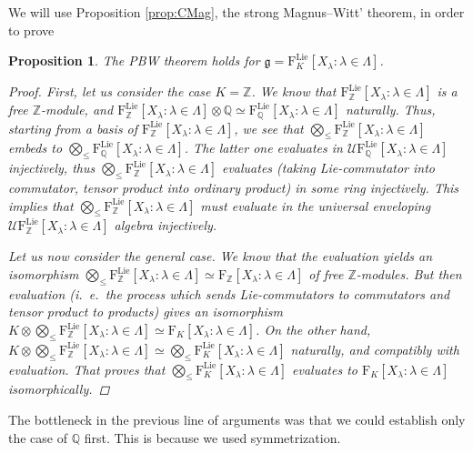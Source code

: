\documentclass[11pt,a4paper]{amsart}
\DeclareMathOperator{\Lie}{Lie}
\theoremstyle{definition}
\theoremstyle{plain}
\newtheorem{prop}[point]{Proposition}
\begin{document}
We will use Proposition \ref{prop:CMag}, the strong Magnus--Witt' theorem, in order to prove
\begin{prop} The PBW theorem holds for  $\mathfrak g=\mathrm F_{K}^{\Lie}[X_\lambda:\lambda\in\Lambda]$.
\begin{proof}First, let us consider the case $K=\mathbb Z$.
We know that
$\mathrm F_{\mathbb Z}^{\Lie}[X_\lambda:\lambda\in\Lambda]$ is a free $\mathbb Z$-module,
 and  $ \mathrm F_{\mathbb Z}^{\Lie}[X_\lambda:\lambda\in\Lambda]\otimes\mathbb Q
 \simeq\mathrm F_{\mathbb Q}^{\Lie}[X_\lambda:\lambda\in\Lambda]$
 naturally.
Thus, starting from a basis of $\mathrm F_{\mathbb Z}^{\Lie}[X_\lambda:\lambda\in\Lambda]$, we see that
 $\bigotimes_\leq \mathrm F_{\mathbb Z}^{\Lie}[X_\lambda:\lambda\in\Lambda]$ embeds to
 $\bigotimes_\leq \mathrm F_{\mathbb Q}^{\Lie}[X_\lambda:\lambda\in\Lambda]$.
The latter one evaluates in $\mathcal U \mathrm F_{\mathbb Q}^{\Lie}[X_\lambda:\lambda\in\Lambda]$ injectively, thus
 $\bigotimes_\leq \mathrm F_{\mathbb Z}^{\Lie}[X_\lambda:\lambda\in\Lambda]$ evaluates
 (taking Lie-commutator into commutator, tensor product into ordinary product) in some ring injectively.
This implies that $\bigotimes_\leq \mathrm F_{\mathbb Z}^{\Lie}[X_\lambda:\lambda\in\Lambda]$
 must evaluate in the universal enveloping  $\mathcal U \mathrm F_{\mathbb Z}^{\Lie}[X_\lambda:\lambda\in\Lambda]$ algebra injectively.

Let us now consider the general case.
We know that the evaluation yields an isomorphism
 $\bigotimes_\leq \mathrm F_{\mathbb Z}^{\Lie}[X_\lambda:\lambda\in\Lambda]\simeq \mathrm F_{\mathbb Z}[X_\lambda:\lambda\in\Lambda]$
 of free $\mathbb Z$-modules.
But then evaluation (i.~e.~the process which sends Lie-commutators to commutators and tensor product to products)
 gives an isomorphism $K\otimes\bigotimes_\leq
 \mathrm F_{\mathbb Z}^{\Lie}[X_\lambda:\lambda\in\Lambda]\simeq \mathrm F_{K}[X_\lambda:\lambda\in\Lambda]$.
On the other hand, $K\otimes\bigotimes_\leq \mathrm F_{\mathbb Z}^{\Lie}[X_\lambda:\lambda\in\Lambda]
 \simeq \bigotimes_\leq \mathrm F_{K}^{\Lie}[X_\lambda:\lambda\in\Lambda]$
 naturally, and compatibly with evaluation. That proves that $\bigotimes_\leq
 \mathrm F_{K}^{\Lie}[X_\lambda:\lambda\in\Lambda]$ evaluates to $\mathrm F_{K}[X_\lambda:\lambda\in\Lambda]$
 isomorphically.
\end{proof}
\end{prop}
The bottleneck  in the previous line of arguments was that we could establish  only the case of $\mathbb Q$ first.
This is because we used symmetrization.
\end{document}
